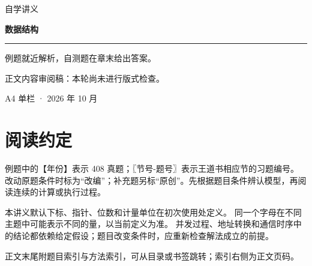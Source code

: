 
\newcommand{\BookTitle}{数据结构}

\begin{titlepage}
\thispagestyle{empty}
\vspace*{25mm}
{\sffamily\color{accent}\fontsize{16}{24} 自学讲义}\par
\vspace{15mm}
{\sffamily\bfseries\color{ink}\fontsize{32}{45}\selectfont 数据结构}\par
\vspace{15mm}
\noindent\rule{\textwidth}{0.5pt}\par
\vspace{5mm}
\noindent 例题就近解析，自测题在章末给出答案。\par
\vspace{5mm}\noindent 正文内容审阅稿：本轮尚未进行版式检查。\par
\vfill
\noindent A4 单栏 · 2026 年 10 月\par
\end{titlepage}
\tableofcontents
\clearpage
{}\chapter*{阅读约定}
例题中的【年份】表示 408 真题；〖节号-题号〗表示王道书相应节的习题编号。
改动原题条件时标为“改编”；补充题另标“原创”。先根据题目条件辨认模型，再阅读连续的计算或执行过程。

本讲义默认下标、指针、位数和计量单位在初次使用处定义。
同一个字母在不同主题中可能表示不同的量，以当前定义为准。
并发过程、地址转换和通信时序中的结论都依赖给定假设；题目改变条件时，应重新检查解法成立的前提。

正文末尾附题目索引与方法索引，可从目录或书签跳转；索引右侧为正文页码。
\clearpage
{}
\setcounter{chapter}{0}



